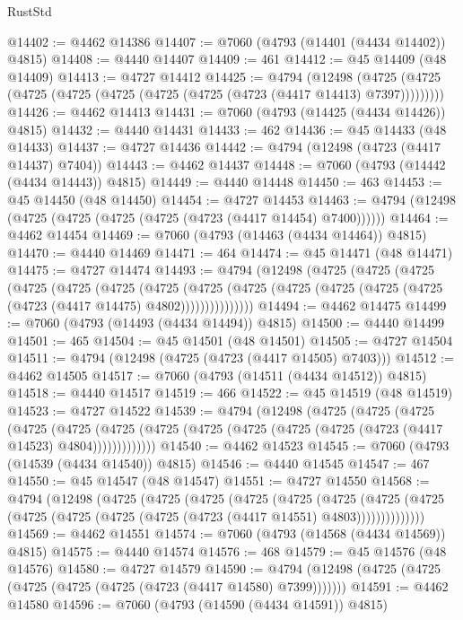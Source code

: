 \begin{lexlean}{RustStd}
\begin{coremodule}
@14402 := @4462 @14386
@14407 := @7060 (@4793 (@14401 (@4434 @14402)) @4815)
@14408 := @4440 @14407
@14409 := 461
@14412 := @45 @14409 (@48 @14409)
@14413 := @4727 @14412
@14425 := @4794
    (@12498 (@4725 (@4725 (@4725 (@4725 (@4725 (@4725 (@4725 (@4723 (@4417 @14413) @7397)))))))))
@14426 := @4462 @14413
@14431 := @7060 (@4793 (@14425 (@4434 @14426)) @4815)
@14432 := @4440 @14431
@14433 := 462
@14436 := @45 @14433 (@48 @14433)
@14437 := @4727 @14436
@14442 := @4794 (@12498 (@4723 (@4417 @14437) @7404))
@14443 := @4462 @14437
@14448 := @7060 (@4793 (@14442 (@4434 @14443)) @4815)
@14449 := @4440 @14448
@14450 := 463
@14453 := @45 @14450 (@48 @14450)
@14454 := @4727 @14453
@14463 := @4794 (@12498 (@4725 (@4725 (@4725 (@4725 (@4723 (@4417 @14454) @7400))))))
@14464 := @4462 @14454
@14469 := @7060 (@4793 (@14463 (@4434 @14464)) @4815)
@14470 := @4440 @14469
@14471 := 464
@14474 := @45 @14471 (@48 @14471)
@14475 := @4727 @14474
@14493 := @4794
    (@12498
      (@4725
        (@4725
          (@4725
            (@4725
              (@4725
                (@4725
                  (@4725
                    (@4725
                      (@4725 (@4725 (@4725 (@4725 (@4725 (@4723 (@4417 @14475) @4802)))))))))))))))
@14494 := @4462 @14475
@14499 := @7060 (@4793 (@14493 (@4434 @14494)) @4815)
@14500 := @4440 @14499
@14501 := 465
@14504 := @45 @14501 (@48 @14501)
@14505 := @4727 @14504
@14511 := @4794 (@12498 (@4725 (@4723 (@4417 @14505) @7403)))
@14512 := @4462 @14505
@14517 := @7060 (@4793 (@14511 (@4434 @14512)) @4815)
@14518 := @4440 @14517
@14519 := 466
@14522 := @45 @14519 (@48 @14519)
@14523 := @4727 @14522
@14539 := @4794
    (@12498
      (@4725
        (@4725
          (@4725
            (@4725
              (@4725
                (@4725 (@4725 (@4725 (@4725 (@4725 (@4725 (@4723 (@4417 @14523) @4804)))))))))))))
@14540 := @4462 @14523
@14545 := @7060 (@4793 (@14539 (@4434 @14540)) @4815)
@14546 := @4440 @14545
@14547 := 467
@14550 := @45 @14547 (@48 @14547)
@14551 := @4727 @14550
@14568 := @4794
    (@12498
      (@4725
        (@4725
          (@4725
            (@4725
              (@4725
                (@4725
                  (@4725
                    (@4725 (@4725 (@4725 (@4725 (@4725 (@4723 (@4417 @14551) @4803))))))))))))))
@14569 := @4462 @14551
@14574 := @7060 (@4793 (@14568 (@4434 @14569)) @4815)
@14575 := @4440 @14574
@14576 := 468
@14579 := @45 @14576 (@48 @14576)
@14580 := @4727 @14579
@14590 := @4794 (@12498 (@4725 (@4725 (@4725 (@4725 (@4725 (@4723 (@4417 @14580) @7399)))))))
@14591 := @4462 @14580
@14596 := @7060 (@4793 (@14590 (@4434 @14591)) @4815)

\end{coremodule}
\end{lexlean}
